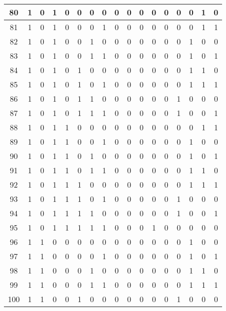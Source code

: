 \documentclass[12pt, oneside, openany]{article}
\begin{document}
{\begin{longtable}[c]{|c||c|c|c|c|c|c|c||c|c|c|c|c|c|c|c|c|}
    \hline
    80 & 1 &  0 & 1 & 0 & 0 & 0 & 0 &  0 & 0 & 0 & 0 &  0 &  0 & 0 & 1 & 0 \\
    \hline
    81 & 1 &  0 & 1 & 0 & 0 & 0 & 1 &  0 & 0 & 0 & 0 &  0 &  0 & 0 & 1 & 1 \\
    \hline
    82 & 1 &  0 & 1 & 0 & 0 & 1 & 0 &  0 & 0 & 0 & 0 &  0 &  0 & 1 & 0 & 0 \\
    \hline
    83 & 1 &  0 & 1 & 0 & 0 & 1 & 1 &  0 & 0 & 0 & 0 &  0 &  0 & 1 & 0 & 1 \\
    \hline
    84 & 1 &  0 & 1 & 0 & 1 & 0 & 0 &  0 & 0 & 0 & 0 &  0 &  0 & 1 & 1 & 0 \\
    \hline
    85 & 1 &  0 & 1 & 0 & 1 & 0 & 1 &  0 & 0 & 0 & 0 &  0 &  0 & 1 & 1 & 1 \\
    \hline
    86 & 1 &  0 & 1 & 0 & 1 & 1 & 0 &  0 & 0 & 0 & 0 &  0 &  1 & 0 & 0 & 0 \\
    \hline
    87 & 1 &  0 & 1 & 0 & 1 & 1 & 1 &  0 & 0 & 0 & 0 &  0 &  1 & 0 & 0 & 1 \\
    \hline
    88 & 1 &  0 & 1 & 1 & 0 & 0 & 0 &  0 & 0 & 0 & 0 &  0 &  0 & 0 & 1 & 1 \\
    \hline
    89 & 1 &  0 & 1 & 1 & 0 & 0 & 1 &  0 & 0 & 0 & 0 &  0 &  0 & 1 & 0 & 0 \\
    \hline
    90 & 1 &  0 & 1 & 1 & 0 & 1 & 0 &  0 & 0 & 0 & 0 &  0 &  0 & 1 & 0 & 1 \\
    \hline
    91 & 1 &  0 & 1 & 1 & 0 & 1 & 1 &  0 & 0 & 0 & 0 &  0 &  0 & 1 & 1 & 0 \\
    \hline
    92 & 1 &  0 & 1 & 1 & 1 & 0 & 0 &  0 & 0 & 0 & 0 &  0 &  0 & 1 & 1 & 1 \\
    \hline
    93 & 1 &  0 & 1 & 1 & 1 & 0 & 1 &  0 & 0 & 0 & 0 &  0 &  1 & 0 & 0 & 0 \\
    \hline
    94 & 1 &  0 & 1 & 1 & 1 & 1 & 0 &  0 & 0 & 0 & 0 &  0 &  1 & 0 & 0 & 1 \\
    \hline
    95 & 1 &  0 & 1 & 1 & 1 & 1 & 1 &  0 & 0 & 0 & 1 &  0 &  0 & 0 & 0 & 0 \\
    \hline
    96 & 1 &  1 & 0 & 0 & 0 & 0 & 0 &  0 & 0 & 0 & 0 &  0 &  0 & 1 & 0 & 0 \\
    \hline
    97 & 1 &  1 & 0 & 0 & 0 & 0 & 1 &  0 & 0 & 0 & 0 &  0 &  0 & 1 & 0 & 1 \\
    \hline
    98 & 1 &  1 & 0 & 0 & 0 & 1 & 0 &  0 & 0 & 0 & 0 &  0 &  0 & 1 & 1 & 0 \\
    \hline
    99 & 1 &  1 & 0 & 0 & 0 & 1 & 1 &  0 & 0 & 0 & 0 &  0 &  0 & 1 & 1 & 1 \\
    \hline
    100 & 1 &  1 & 0 & 0 & 1 & 0 & 0 &  0 & 0 & 0 & 0 &  0 &  1 & 0 & 0 & 0 \\

\end{longtable}}
\end{document}
